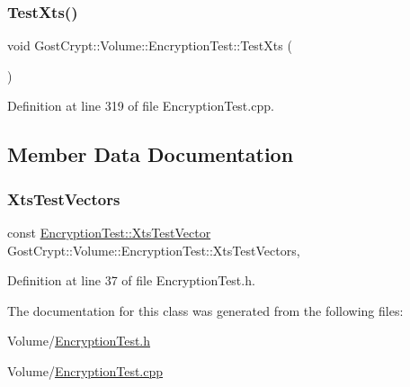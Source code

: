 \mbox{\label{class_gost_crypt_1_1_volume_1_1_encryption_test_aa28cdd852e4411f740a616712efb6966}} 
\subsubsection{\texorpdfstring{Test\+Xts()}{TestXts()}}
{\footnotesize\ttfamily void Gost\+Crypt\+::\+Volume\+::\+Encryption\+Test\+::\+Test\+Xts (\begin{DoxyParamCaption}{ }\end{DoxyParamCaption})\hspace{0.3cm}{\ttfamily [static]}}



Definition at line 319 of file Encryption\+Test.\+cpp.



\subsection{Member Data Documentation}
\mbox{\label{class_gost_crypt_1_1_volume_1_1_encryption_test_ab83d61ed8db4354a4598648808c65f26}} 
\subsubsection{\texorpdfstring{Xts\+Test\+Vectors}{XtsTestVectors}}
{\footnotesize\ttfamily const \hyperlink{struct_gost_crypt_1_1_volume_1_1_encryption_test_1_1_xts_test_vector}{Encryption\+Test\+::\+Xts\+Test\+Vector} Gost\+Crypt\+::\+Volume\+::\+Encryption\+Test\+::\+Xts\+Test\+Vectors\hspace{0.3cm}{\ttfamily [static]}, {\ttfamily [protected]}}



Definition at line 37 of file Encryption\+Test.\+h.



The documentation for this class was generated from the following files\+:\begin{DoxyCompactItemize}
\item 
Volume/\hyperlink{_encryption_test_8h}{Encryption\+Test.\+h}\item 
Volume/\hyperlink{_encryption_test_8cpp}{Encryption\+Test.\+cpp}\end{DoxyCompactItemize}
